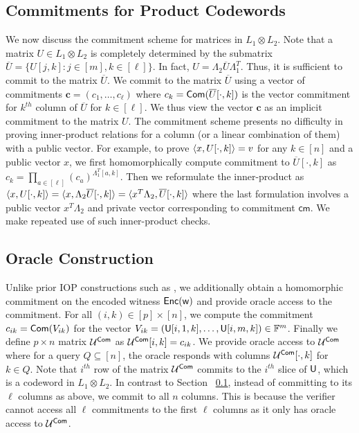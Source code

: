 \subsection{Commitments for Product Codewords}\label{sec:matrixcommitment}
We now discuss the commitment scheme
for matrices in $L_1\otimes L_2$. %
Note that a matrix $U\in L_1\otimes L_2$ is
completely determined by the submatrix $\overline{U}=\{U[j,k]: j\in [m], k\in [\ell]\}$.
In fact, $U=\Lambda_2\overline{U}\Lambda_1^T$. Thus, it is sufficient to commit to the matrix $\overline{U}$. We commit to the
matrix $\overline{U}$ using a vector of commitments $\bm{c}=(c_1,\ldots,c_\ell)$
where $c_k=\mathsf{Com}(\overline{U}[\cdot,k])$ is the vector commitment for $k^{th}$
column of $\overline{U}$ for $k\in [\ell]$. We thus view the vector $\bm{c}$ as 
an implicit commitment to the matrix $U$. 
The commitment scheme presents no difficulty in 
proving inner-product relations for a column (or a linear combination of them) with a public vector.
For example, to prove $\langle x,U[\cdot,k]\rangle=v$ for any $k \in [n]$ and a public vector $x$, we first homomorphically compute commitment
to $\overline{U}[\cdot,k]$ as $c_k=\prod_{a\in [\ell]}(c_a)^{\Lambda_1^T[a,k]}$. 
Then we reformulate the inner-product as 
$\langle x,U[\cdot,k]\rangle=\langle x,\Lambda_2\overline{U}[\cdot,k]\rangle=\langle x^T\Lambda_2,\overline{U}[\cdot,k]\rangle$ where the last formulation involves a public vector $x^T\Lambda_2$ and private vector corresponding to commitment $\mathsf{cm}$. We make repeated use of such inner-product checks.   

\subsection{Oracle Construction}\label{sec:construct_oracle} 
Unlike prior IOP constructions such as \cite{ligero, aurora}, we additionally
obtain a homomorphic commitment on the encoded witness $\mathsf{Enc}(\mathsf{w})$ and provide
oracle access to the commitment. 
For all $(i,k)\in [p]\times
[n]$, we  compute the commitment %
$c_{ik}=\mathsf{Com}(V_{ik})$ for the vector 
$V_{ik}=(\mathsf{U}[i,1,k],\ldots,\mathsf{U}[i,m,k])\in \mathbb{F}^m$. 
Finally we define $p\times n$ matrix $\mathcal{U}^{\mathsf{Com}}$ as
$\mathcal{U}^{\mathsf{Com}}[i,k]=c_{ik}$. We provide oracle access to $\mathcal{U}^{\mathsf{Com}}$ where for a
query $Q\subseteq [n]$, the oracle responds with columns $\mathcal{U}^{\mathsf{Com}}[\cdot,k]$ for
$k\in Q$. Note that $i^{th}$ row of the matrix $\mathcal{U}^{\mathsf{Com}}$ commits to the
$i^{th}$ slice of $\mathsf{U}$, which is a codeword in $L_1\otimes L_2$. In contrast
to Section ~\ref{sec:matrixcommitment}, instead of
committing to its $\ell$ columns as above, we commit to all $n$ columns. This is
because the verifier cannot access all $\ell$ commitments to the first $\ell$ columns
as it only has oracle access to $\mathcal{U}^{\mathsf{Com}}$. 


